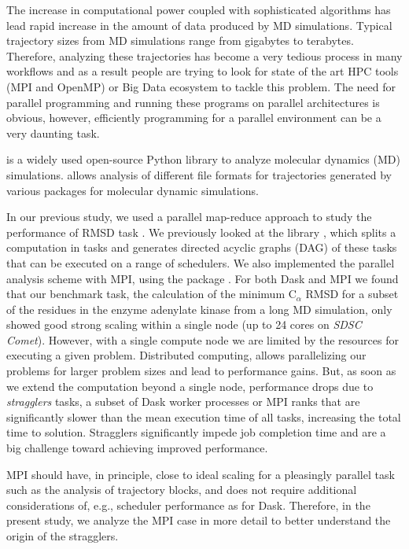 \label{sec:introduction}
The increase in computational power coupled with sophisticated algorithms has lead rapid increase in the amount of data produced by MD simulations. 
Typical trajectory sizes from MD simulations range from gigabytes to terabytes. 
Therefore, analyzing these trajectories has become a very tedious process in many workflows and as a result people are trying to look for state of the art HPC tools (MPI and OpenMP) or Big Data ecosystem to tackle this problem.
The need for parallel programming and running these programs on parallel architectures is obvious, however, efficiently programming for a parallel environment can be a very daunting task. 

 \citep{Gowers:2016aa,Michaud-Agrawal:2011fu} is a widely used open-source Python library to analyze molecular dynamics (MD) simulations. 
 allows analysis of different file formats for trajectories generated by various packages for molecular dynamic simulations. 

In our previous study, we used a parallel map-reduce approach to study the performance of RMSD task \citep{Khoshlessan:2017ab}. 
We previously looked at the  library \citep{Rocklin:2015aa}, which splits a computation in tasks and generates directed acyclic graphs (DAG) of these tasks that can be executed on a range of schedulers. 
We also implemented the parallel analysis scheme with MPI, using the  package \citep{Dalcin:2011aa, Dalcin:2005aa}. 
For both Dask and MPI we found that our benchmark task, the calculation of the minimum C$_{\alpha}$ RMSD for a
subset of the residues in the enzyme adenylate kinase from a long MD simulation, only showed good strong scaling within a single node (up
to 24 cores on \emph{SDSC Comet}).
However, with a single compute node we are limited by the resources for executing a given problem.
Distributed computing, allows parallelizing our problems for larger problem sizes and lead to performance gains.
But, as soon as we extend the computation beyond a single node, performance drops due to \emph{stragglers} tasks, a subset of Dask worker processes or MPI ranks that are significantly slower than the mean execution time of all tasks, increasing the total time to solution.
Stragglers significantly impede job completion time and are a big challenge toward achieving improved performance.

MPI should have, in principle, close to ideal scaling for a pleasingly parallel task such as the analysis of trajectory blocks, and does not require additional considerations of, e.g., scheduler performance as for Dask. 
Therefore, in the present study, we analyze the MPI case in more detail to better understand the origin of the stragglers.

